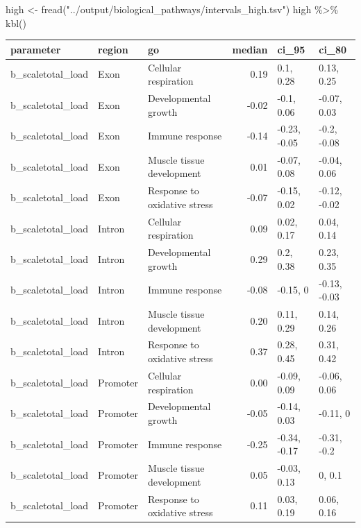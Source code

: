 \documentclass[
  letterpaper,
  DIV=11,
  numbers=noendperiod]{scrreprt}
\newenvironment{Shaded}{}{}
\newcommand{\FunctionTok}[1]{\textcolor[rgb]{0.44,0.26,0.76}{#1}}
\newcommand{\NormalTok}[1]{\textcolor[rgb]{0.14,0.16,0.18}{#1}}
\newcommand{\OtherTok}[1]{\textcolor[rgb]{0.44,0.26,0.76}{#1}}
\newcommand{\SpecialCharTok}[1]{\textcolor[rgb]{0.00,0.36,0.77}{#1}}
\newcommand{\StringTok}[1]{\textcolor[rgb]{0.01,0.18,0.38}{#1}}
\begin{document}
\begin{Shaded}
\begin{Highlighting}[]
\NormalTok{high }\OtherTok{\textless{}{-}} \FunctionTok{fread}\NormalTok{(}\StringTok{"../output/biological\_pathways/intervals\_high.tsv"}\NormalTok{)}
\NormalTok{high }\SpecialCharTok{\%\textgreater{}\%} \FunctionTok{kbl}\NormalTok{()}
\end{Highlighting}
\end{Shaded}

\begin{tabular}[t]{l|l|l|r|l|l}
\hline
parameter & region & go & median & ci\_95 & ci\_80\\
\hline
b\_scaletotal\_load & Exon & Cellular respiration & 0.19 & 0.1, 0.28 & 0.13, 0.25\\
\hline
b\_scaletotal\_load & Exon & Developmental growth & -0.02 & -0.1, 0.06 & -0.07, 0.03\\
\hline
b\_scaletotal\_load & Exon & Immune response & -0.14 & -0.23, -0.05 & -0.2, -0.08\\
\hline
b\_scaletotal\_load & Exon & Muscle tissue development & 0.01 & -0.07, 0.08 & -0.04, 0.06\\
\hline
b\_scaletotal\_load & Exon & Response to oxidative stress & -0.07 & -0.15, 0.02 & -0.12, -0.02\\
\hline
b\_scaletotal\_load & Intron & Cellular respiration & 0.09 & 0.02, 0.17 & 0.04, 0.14\\
\hline
b\_scaletotal\_load & Intron & Developmental growth & 0.29 & 0.2, 0.38 & 0.23, 0.35\\
\hline
b\_scaletotal\_load & Intron & Immune response & -0.08 & -0.15, 0 & -0.13, -0.03\\
\hline
b\_scaletotal\_load & Intron & Muscle tissue development & 0.20 & 0.11, 0.29 & 0.14, 0.26\\
\hline
b\_scaletotal\_load & Intron & Response to oxidative stress & 0.37 & 0.28, 0.45 & 0.31, 0.42\\
\hline
b\_scaletotal\_load & Promoter & Cellular respiration & 0.00 & -0.09, 0.09 & -0.06, 0.06\\
\hline
b\_scaletotal\_load & Promoter & Developmental growth & -0.05 & -0.14, 0.03 & -0.11, 0\\
\hline
b\_scaletotal\_load & Promoter & Immune response & -0.25 & -0.34, -0.17 & -0.31, -0.2\\
\hline
b\_scaletotal\_load & Promoter & Muscle tissue development & 0.05 & -0.03, 0.13 & 0, 0.1\\
\hline
b\_scaletotal\_load & Promoter & Response to oxidative stress & 0.11 & 0.03, 0.19 & 0.06, 0.16\\
\hline
\end{tabular}
\end{document}
